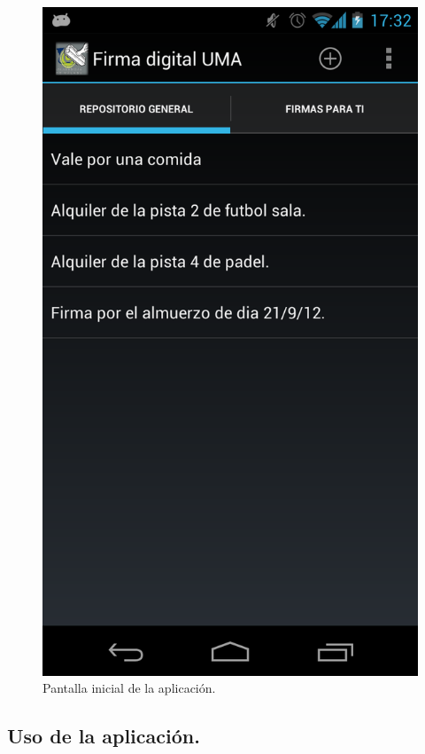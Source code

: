 \begin{figure}[h]
  \centering
    \includegraphics[scale=0.2]{./Android/imagenes/pantallaPrincipal.png}
  \caption{Pantalla inicial de la aplicación.}
  \label{fig:pantallaPrincipal}
\end{figure}

\subsection{Uso de la aplicación.}

